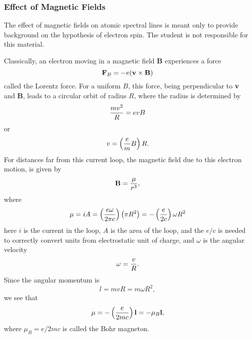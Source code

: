 \subsubsection{Effect of Magnetic Fields}

The effect of magnetic fields on atomic spectral lines is meant only 
to provide background on the hypothesis of electron spin. The student 
is not responsible for this material.

Classically, an electron moving in a magnetic field {\bf B} 
experiences a force
\begin{equation}
{\bf F}_B = - e ( {\bf v} \times {\bf B} ) 
\end{equation}
called the Lorentz force.  For a uniform $B$, this force, being 
perpendicular to {\bf v} and {\bf B}, leads to a circular orbit of radius 
$R$, where the radius is determined by
\begin{equation}
{mv^2 \over R} = evB
\end{equation}
or
\begin{equation}
v = \left( {e \over m} B \right) R .
\end{equation}
For distances far from this current loop, the magnetic field due to 
this electron motion, is given by
\begin{equation}
{\bf B} = {\mu \over r^3} ,
\end{equation}
where
\begin{equation}
\mu = i A = \left( {e \omega \over 2 \pi c} \right) \left( \pi R^2 
\right) = - \left( {e \over 2c} \right) \omega R^2
\end{equation}
here $i$ is the current in the loop, $A$ is the area of the loop, and 
the $e/c$ is needed to correctly convert units from electrostatic unit 
of charge, and $\omega$ is the angular velocity
\begin{equation}
\omega = {v \over R} .
\end{equation}
Since the angular momentum is
\begin{equation}
l = mvR = m \omega R^2 ,
\end{equation}
we see that
\begin{equation}
\mu = - \left( {e \over 2mc} \right) {\bf l} = - \mu_B {\bf l} 
,
\label{chap4app-eqno27}
\end{equation}
where $\mu_B= e/2mc$ is called the Bohr magneton.

